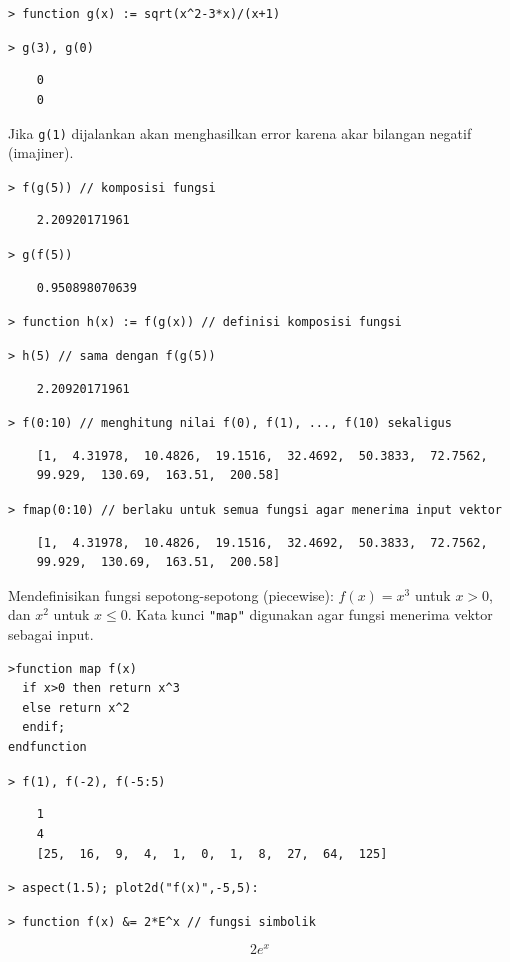 \documentclass[11pt, a4paper]{article}
\newcommand{\emtcmd}[1]{\noindent\texttt{\textcolor{emtcommand}{>}\ #1}\par\smallskip}
\begin{document}
\emtcmd{function g(x) := sqrt(x\^{}2-3*x)/(x+1)}
\emtcmd{g(3), g(0)}
\begin{verbatim}
    0
    0
\end{verbatim}

Jika \texttt{g(1)} dijalankan akan menghasilkan error karena akar bilangan negatif (imajiner).

\emtcmd{f(g(5)) \textcolor{emtcomment}{// komposisi fungsi}}
\begin{verbatim}
    2.20920171961
\end{verbatim}

\emtcmd{g(f(5))}
\begin{verbatim}
    0.950898070639
\end{verbatim}

\emtcmd{function h(x) := f(g(x)) \textcolor{emtcomment}{// definisi komposisi fungsi}}
\emtcmd{h(5) \textcolor{emtcomment}{// sama dengan f(g(5))}}
\begin{verbatim}
    2.20920171961
\end{verbatim}

\emtcmd{f(0:10) \textcolor{emtcomment}{// menghitung nilai f(0), f(1), ..., f(10) sekaligus}}
\begin{verbatim}
    [1,  4.31978,  10.4826,  19.1516,  32.4692,  50.3833,  72.7562,
    99.929,  130.69,  163.51,  200.58]
\end{verbatim}

\emtcmd{fmap(0:10) \textcolor{emtcomment}{// berlaku untuk semua fungsi agar menerima input vektor}}
\begin{verbatim}
    [1,  4.31978,  10.4826,  19.1516,  32.4692,  50.3833,  72.7562,
    99.929,  130.69,  163.51,  200.58]
\end{verbatim}

Mendefinisikan fungsi sepotong-sepotong (piecewise): $f(x) = x^3$ untuk $x > 0$, dan $x^2$ untuk $x \le 0$. Kata kunci \texttt{"map"} digunakan agar fungsi menerima vektor sebagai input.
\begin{verbatim}
>function map f(x)
  if x>0 then return x^3
  else return x^2
  endif;
endfunction
\end{verbatim}

\emtcmd{f(1), f(-2), f(-5:5)}
\begin{verbatim}
    1
    4
    [25,  16,  9,  4,  1,  0,  1,  8,  27,  64,  125]
\end{verbatim}

\emtcmd{aspect(1.5); plot2d("f(x)",-5,5):}

\emtcmd{function f(x) \&= 2*E\^{}x \textcolor{emtcomment}{// fungsi simbolik}}
$$2 e^x$$
\end{document}

